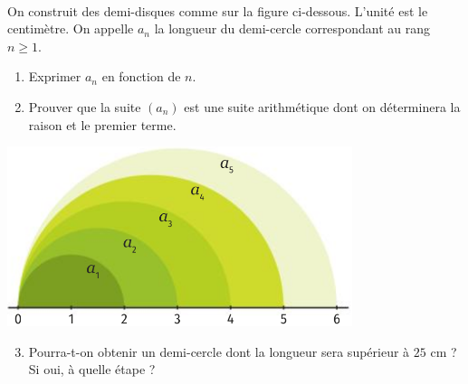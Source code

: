 \documentclass[11pt]{article}
\begin{document}
\begin{exo}~\\
  \begin{minipage}[]{.5\textwidth}
    On construit des demi-disques comme sur la figure ci-dessous. L'unité est le
    centimètre. On appelle $a_n$ la longueur du demi-cercle correspondant au
    rang $n\geq1$.
    \begin{enumerate}
      \item Exprimer $a_n$ en fonction de $n$.
      \item Prouver que la suite $\left( a_n \right)$ est une suite arithmétique
        dont on déterminera la raison et le premier terme.
    \end{enumerate}
  \end{minipage}
  \begin{minipage}[]{.5\textwidth}
    \begin{center}
      \includegraphics[scale=.6]{cercles.png}
    \end{center}
  \end{minipage}
  \begin{enumerate}
      \setcounter{enumi}{2}
      \item Pourra-t-on obtenir un demi-cercle dont la longueur sera supérieur à
        $25$ cm ? Si oui, à quelle étape ?
  \end{enumerate}
\end{exo}
\end{document}
